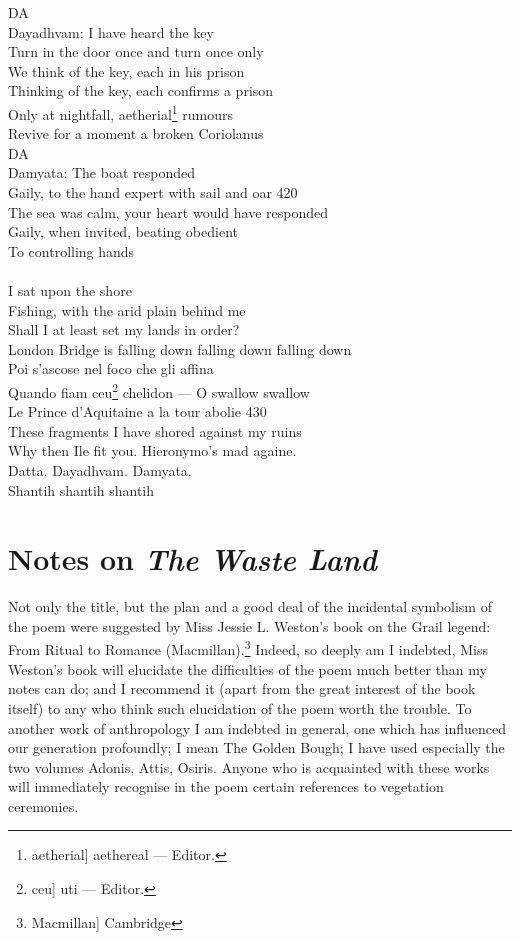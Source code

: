 \documentclass{article}
\begin{document}
DA \\
Dayadhvam: I have heard the key \\
Turn in the door once and turn once only \\
We think of the key, each in his prison \\
Thinking of the key, each confirms a prison \\
Only at nightfall, aetherial\footnote{aetherial] aethereal --- Editor.} rumours \\
Revive for a moment a broken Coriolanus \\
DA \\
Damyata: The boat responded \\
Gaily, to the hand expert with sail and oar                     \hfill 420 \\
The sea was calm, your heart would have responded \\
Gaily, when invited, beating obedient \\
To controlling hands \\
 \\
\hspace*{2in} I sat upon the shore \\
Fishing, with the arid plain behind me \\
Shall I at least set my lands in order? \\
London Bridge is falling down falling down falling down \\
Poi s'ascose nel foco che gli affina \\
Quando fiam ceu\footnote{ceu] uti --- Editor.} chelidon --- O swallow swallow \\
Le Prince d'Aquitaine a la tour abolie                 \hfill 430 \\
These fragments I have shored against my ruins \\
Why then Ile fit you. Hieronymo's mad againe. \\
Datta. Dayadhvam. Damyata. \\
\hspace*{1.9in}  Shantih \indent shantih \indent shantih \\

\appendix
\section{Notes on \emph{The Waste Land}}

Not only the title, but the plan and a good deal of the
incidental symbolism of the poem were suggested
by Miss Jessie L. Weston's book on the Grail legend:
From Ritual to Romance (Macmillan).\footnote{Macmillan] Cambridge} Indeed,
so deeply am I indebted, Miss Weston's book will elucidate
the difficulties of the poem much better than my notes can do;
and I recommend it (apart from the great interest of the book itself)
to any who think such elucidation of the poem worth the trouble.
To another work of anthropology I am indebted in general, one which has
influenced our generation profoundly; I mean The Golden Bough; I have
used especially the two volumes Adonis, Attis, Osiris.  Anyone who is
acquainted with these works will immediately recognise in the poem
certain references to vegetation ceremonies.
\end{document}
